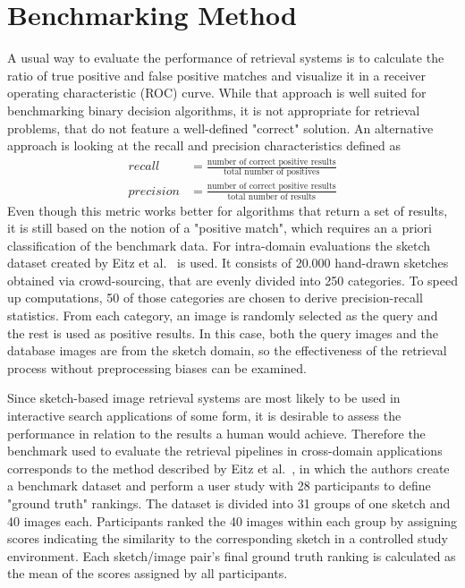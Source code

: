 \section{Benchmarking Method}\label{sec:results_benchmarking}

A usual way to evaluate the performance of retrieval systems is to calculate
the ratio of true positive and false positive matches and visualize it in a
receiver operating characteristic (ROC) curve. While that approach is well
suited for benchmarking binary decision algorithms, it is not appropriate for
retrieval problems, that do not feature a well-defined "correct" solution. An
alternative approach is looking at the recall and precision characteristics
defined as
\begin{align*}
    recall & = \frac{\text{number of correct positive results}}{\text{total number of positives}} \\
    precision & = \frac{\text{number of correct positive results}}{\text{total number of results}}
\end{align*}
Even though this metric works better for algorithms that return a set of
results, it is still based on the notion of a "positive match", which requires
an a priori classification of the benchmark data. For intra-domain evaluations
the sketch dataset created by Eitz et al.\ \autocite{eitz_how_2012} is used.
It consists of 20.000 hand-drawn sketches obtained via crowd-sourcing, that are
evenly divided into 250 categories. To speed up computations, 50 of those
categories are chosen to derive precision-recall statistics. From each
category, an image is randomly selected as the query and the rest is used as
positive results. In this case, both the query images and the database images
are from the sketch domain, so the effectiveness of the retrieval process
without preprocessing biases can be examined.

Since sketch-based image retrieval systems are most likely to be used in
interactive search applications of some form, it is desirable to assess the
performance in relation to the results a human would achieve.  Therefore the
benchmark used to evaluate the retrieval pipelines in cross-domain applications
corresponds to the method described by Eitz et al.\
\autocite{eitz_sketch-based_2011}, in which the authors create a benchmark
dataset and perform a user study with 28 participants to define "ground truth"
rankings. The dataset is divided into 31 groups of one sketch and 40 images
each. Participants ranked the 40 images within each group by assigning scores
indicating the similarity to the corresponding sketch in a controlled study
environment. Each sketch/image pair's final ground truth ranking is calculated
as the mean of the scores assigned by all participants.

